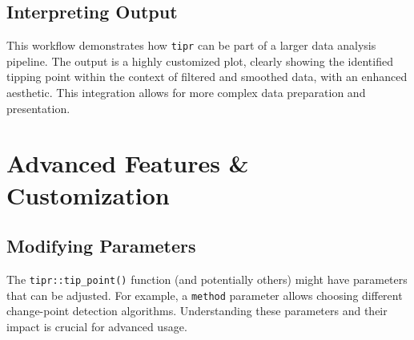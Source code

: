 \documentclass[
  10pt,
  letterpaper,
  DIV=11,
  numbers=noendperiod]{scrartcl}
\begin{document}
\subsection{Interpreting Output}\label{interpreting-output-2}

This workflow demonstrates how \texttt{tipr} can be part of a larger
data analysis pipeline. The output is a highly customized plot, clearly
showing the identified tipping point within the context of filtered and
smoothed data, with an enhanced aesthetic. This integration allows for
more complex data preparation and presentation.

\section{Advanced Features \&
Customization}\label{advanced-features-customization}

\subsection{Modifying Parameters}\label{modifying-parameters}

The \texttt{tipr::tip\_point()} function (and potentially others) might
have parameters that can be adjusted. For example, a \texttt{method}
parameter allows choosing different change-point detection algorithms.
Understanding these parameters and their impact is crucial for advanced
usage.
\end{document}
